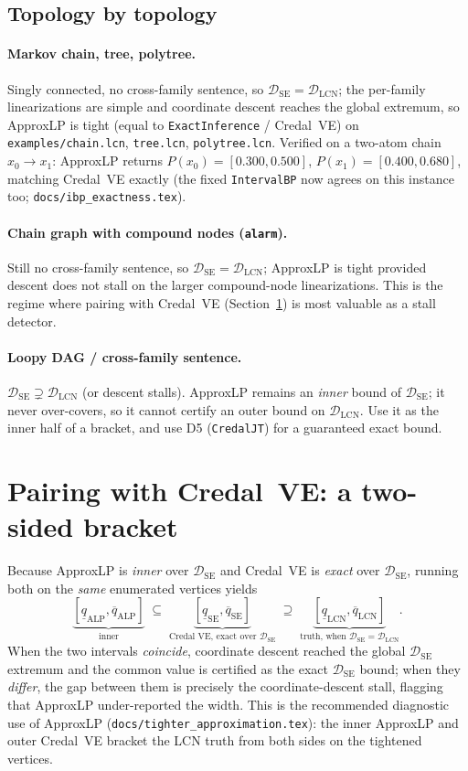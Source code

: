 \documentclass[11pt]{article}
\newcommand{\lo}{\underline}
\newcommand{\hi}{\overline}
\newcommand{\DSE}{\mathcal{D}_{\mathrm{SE}}}
\newcommand{\DLCN}{\mathcal{D}_{\mathrm{LCN}}}
\begin{document}
\subsection{Topology by topology}
\paragraph{Markov chain, tree, polytree.} Singly connected, no cross-family sentence, so
$\DSE=\DLCN$; the per-family linearizations are simple and coordinate descent reaches the global
extremum, so ApproxLP is tight (equal to \texttt{ExactInference} / Credal~VE) on
\texttt{examples/chain.lcn}, \texttt{tree.lcn}, \texttt{polytree.lcn}. Verified on a two-atom chain
$x_0\!\to\!x_1$: ApproxLP returns $P(x_0){=}[0.300,0.500]$, $P(x_1){=}[0.400,0.680]$, matching
Credal~VE exactly (the fixed \texttt{IntervalBP} now agrees on this instance too;
\texttt{docs/ibp\_exactness.tex}).

\paragraph{Chain graph with compound nodes (\texttt{alarm}).} Still no cross-family sentence, so
$\DSE=\DLCN$; ApproxLP is tight provided descent does not stall on the larger compound-node
linearizations. This is the regime where pairing with Credal~VE (Section~\ref{sec:pairing}) is most
valuable as a stall detector.

\paragraph{Loopy DAG / cross-family sentence.} $\DSE\supsetneq\DLCN$ (or descent stalls). ApproxLP
remains an \emph{inner} bound of $\DSE$; it never over-covers, so it cannot certify an outer bound on
$\DLCN$. Use it as the inner half of a bracket, and use D5 (\texttt{CredalJT}) for a guaranteed exact
bound.

\section{Pairing with Credal~VE: a two-sided bracket}\label{sec:pairing}

Because ApproxLP is \emph{inner} over $\DSE$ and Credal~VE is \emph{exact} over $\DSE$, running both
on the \emph{same} enumerated vertices yields
\[
  \underbrace{[\lo q_{\mathrm{ALP}},\hi q_{\mathrm{ALP}}]}_{\text{inner}}
  \;\subseteq\;
  \underbrace{[\lo q_{\mathrm{SE}},\hi q_{\mathrm{SE}}]}_{\text{Credal~VE, exact over }\DSE}
  \;\supseteq\;
  \underbrace{[\lo q_{\mathrm{LCN}},\hi q_{\mathrm{LCN}}]}_{\text{truth, when }\DSE=\DLCN}.
\]
When the two intervals \emph{coincide}, coordinate descent reached the global $\DSE$ extremum and the
common value is certified as the exact $\DSE$ bound; when they \emph{differ}, the gap between them
is precisely the coordinate-descent stall, flagging that ApproxLP under-reported the width. This is
the recommended diagnostic use of ApproxLP (\texttt{docs/tighter\_approximation.tex}): the inner
ApproxLP and outer Credal~VE bracket the LCN truth from both sides on the tightened vertices.
\end{document}
